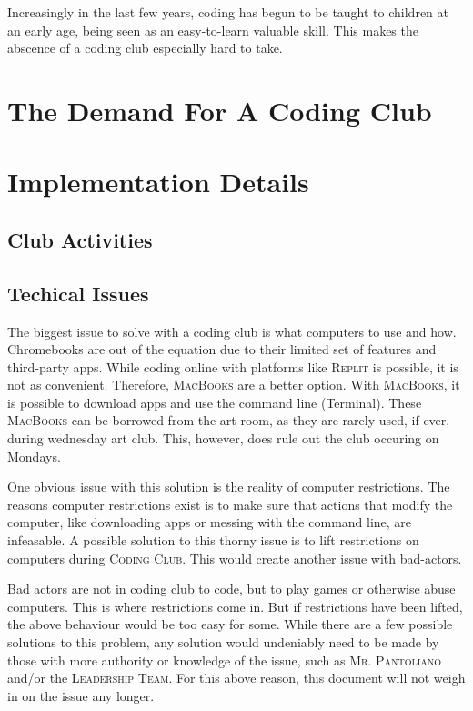 \documentclass{report}
\begin{document}
        Increasingly in the last few years, coding has begun to be taught to children at an early age, being seen as an easy-to-learn valuable skill. This makes the abscence of a coding club especially hard to take.

    \section{The Demand For A Coding Club}
    \section{Implementation Details}

        \subsection{Club Activities}



        \subsection{Techical Issues}

            The biggest issue to solve with a coding club is what computers to use and how. Chromebooks are out of the equation due to their limited set of features and third-party apps. While coding online with platforms like \textsc{Replit} is possible, it is not as convenient. Therefore, \textsc{MacBooks} are a better option. With \textsc{MacBooks}, it is possible to download apps and use the command line (Terminal). These \textsc{MacBooks} can be borrowed from the art room, as they are rarely used, if ever, during wednesday art club. This, however, does rule out the club occuring on Mondays.

            One obvious issue with this solution is the reality of computer restrictions. The reasons computer restrictions exist is to make sure that actions that modify the computer, like downloading apps or messing with the command line, are infeasable. A possible solution to this thorny issue is to lift restrictions on computers during \textsc{Coding Club}. This would create another issue with bad-actors.

            Bad actors are not in coding club to code, but to play games or otherwise abuse computers. This is where restrictions come in. But if restrictions have been lifted, the above behaviour would be too easy for some. While there are a few possible solutions to this problem, any solution would undeniably need to be made by those with more authority or knowledge of the issue, such as \textsc{Mr. Pantoliano} and/or the \textsc{Leadership Team}. For this above reason, this document will not weigh in on the issue any longer.
\end{document}
